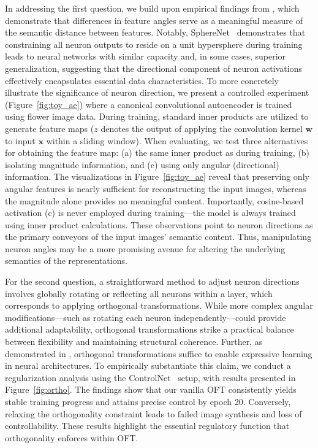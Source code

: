 In addressing the first question, we build upon empirical findings from \cite{liu2018decoupled,chen2020angular}, which demonstrate that differences in feature angles serve as a meaningful measure of the semantic distance between features. Notably, SphereNet~\cite{liu2017deep} demonstrates that constraining all neuron outputs to reside on a unit hypersphere during training leads to neural networks with similar capacity and, in some cases, superior generalization, suggesting that the directional component of neuron activations effectively encapsulates essential data characteristics. To more concretely illustrate the significance of neuron direction, we present a controlled experiment (Figure~\ref{fig:toy_ae}) where a canonical convolutional autoencoder is trained using flower image data. During training, standard inner products are utilized to generate feature maps ($z$ denotes the output of applying the convolution kernel $\bm{w}$ to input $\bm{x}$ within a sliding window). When evaluating, we test three alternatives for obtaining the feature map: (a) the same inner product as during training, (b) isolating magnitude information, and (c) using only angular (directional) information. The visualizations in Figure~\ref{fig:toy_ae} reveal that preserving only angular features is nearly sufficient for reconstructing the input images, whereas the magnitude alone provides no meaningful content. Importantly, cosine-based activation (c) is never employed during training—the model is always trained using inner product calculations. These observations point to neuron directions as the primary conveyors of the input images' semantic content. Thus, manipulating neuron angles may be a more promising avenue for altering the underlying semantics of the representations.

For the second question, a straightforward method to adjust neuron directions involves globally rotating or reflecting all neurons within a layer, which corresponds to applying orthogonal transformations. While more complex angular modifications—such as rotating each neuron independently—could provide additional adaptability, orthogonal transformations strike a practical balance between flexibility and maintaining structural coherence. Further, as demonstrated in \cite{liu2021orthogonal}, orthogonal transformations suffice to enable expressive learning in neural architectures. To empirically substantiate this claim, we conduct a regularization analysis using the ControlNet~\cite{zhang2023adding} setup, with results presented in Figure~\ref{fig:ortho}. The findings show that our vanilla OFT consistently yields stable training progress and attains precise control by epoch 20. Conversely, relaxing the orthogonality constraint leads to failed image synthesis and loss of controllability. These results highlight the essential regulatory function that orthogonality enforces within OFT.

